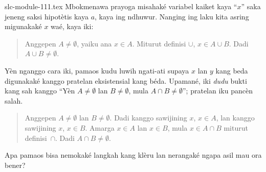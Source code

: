 \begin{filecontents*}[overwrite]{slc-module-111.tex}
Mbokmenawa prayoga misahaké variabel kaiket kaya ``$x$''
saka jeneng saksi hipotètis kaya $a$, kaya ing ndhuwur.
Nanging ing laku kita asring migunakaké $x$ waé, kaya iki:
\begin{quote}
Anggepen $A \neq \emptyset$, yaiku ana $x \in A$.
Miturut definisi $\cup$, $x \in A \cup B$.
Dadi $A \cup B \neq \emptyset$.
\end{quote}
Yèn nganggo cara iki, pamaos kudu luwih ngati-ati
supaya $x$ lan $y$ kang beda digunakaké kanggo pratelan
eksistensial kang béda. Upamané, iki \emph{dudu} bukti
kang sah kanggo ``Yèn $A \neq \emptyset$ lan $B \neq
\emptyset$, mula $A \cap B \neq \emptyset$''; pratelan
iku pancèn salah.
\begin{quote}
Anggepen $A \neq \emptyset$ lan $B \neq \emptyset$.
Dadi kanggo sawijining $x$, $x \in A$, lan kanggo
sawijining $x$, $x \in B$. Amarga $x \in A$ lan $x \in
B$, mula $x \in A \cap B$ miturut definisi~$\cap$.
Dadi $A \cap B \neq \emptyset$.
\end{quote}
Apa pamaos bisa nemokaké langkah kang klèru lan nerangaké
ngapa asil mau ora bener?


\end{filecontents*}

